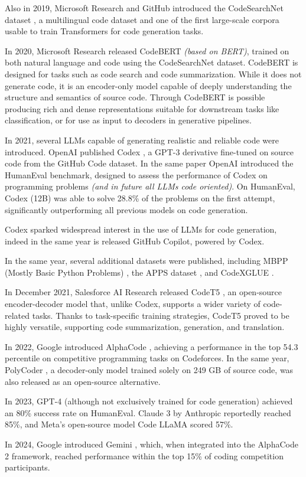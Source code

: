 Also in 2019, Microsoft Research and GitHub introduced the 
CodeSearchNet dataset \cite{husain2019codesearchnet}, a 
multilingual code dataset and one of the first large-scale 
corpora usable to train Transformers for code generation tasks.

In 2020, Microsoft Research released CodeBERT 
\cite{feng2020codebert} \textit{(based on BERT)}, 
trained on both natural 
language and code using the CodeSearchNet dataset. 
CodeBERT is designed for tasks such as code search 
and code summarization. While it does not generate code, 
it is an encoder-only model capable of deeply understanding 
the structure and semantics of source code. Through 
CodeBERT is possible producing rich 
and dense representations suitable for downstream tasks like 
classification, or for use as input to decoders in generative 
pipelines.

In 2021, several LLMs capable of generating realistic and 
reliable code were introduced. OpenAI published Codex 
\cite{chen2021codex}, a GPT-3 derivative fine-tuned on 
source code from the GitHub Code dataset. In the same paper 
OpenAI introduced the HumanEval benchmark, designed to assess the 
performance of Codex on programming problems 
\textit{(and in future all LLMs code oriented)}.
On HumanEval, Codex (12B) was able to solve 28.8\% 
of the problems on the 
first attempt, significantly outperforming all previous 
models on code generation.

Codex sparked widespread interest in the use of LLMs 
for code generation, indeed in the same year is released 
GitHub Copilot, powered by Codex.

In the same year, several additional datasets were 
published, including MBPP (Mostly Basic Python Problems) 
\cite{austin2021mbpp}, the APPS dataset \cite{hendrycks2021apps}, 
and CodeXGLUE \cite{lu2021codexglue}.

In December 2021, Salesforce AI Research released CodeT5 
\cite{wang2021codet5}, an open-source encoder-decoder 
model that, unlike Codex, supports a wider variety of 
code-related tasks. Thanks to task-specific training strategies, 
CodeT5 proved to be highly versatile, supporting code 
summarization, generation, and translation.

In 2022, Google introduced AlphaCode \cite{li2022alphacode}, 
achieving a performance in the top 54.3 percentile on 
competitive programming tasks on Codeforces. In the same 
year, PolyCoder \cite{xu2022polycoder}, a decoder-only 
model trained solely on 249 GB of source code, was also 
released as an open-source alternative. 

In 2023, GPT-4 \cite{openai2023gpt4} (although not 
exclusively trained for code generation)  
achieved an 80\% success rate on HumanEval. 
Claude 3 by Anthropic reportedly reached 85\%, 
and Meta’s open-source model Code LLaMA 
\cite{roziere2023code} scored 57\%.

In 2024, Google introduced Gemini \cite{google2024gemini}, 
which, when integrated into the AlphaCode 2 framework, 
reached performance within the top 15\% of coding competition 
participants.
